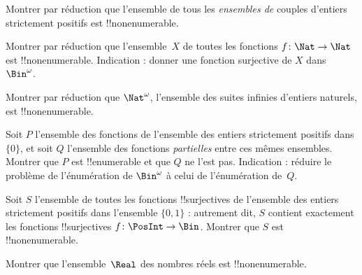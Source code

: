 \documentclass[../../../include/open-logic-section]{subfiles}
\begin{document}
\begin{prob}
Montrer par réduction que l'ensemble de tous les \emph{ensembles de}
couples d'entiers strictement positifs est !!{nonenumerable}.
\end{prob}

\begin{prob}\label{sfr:siz:red:prob:nat-nat}
  Montrer par réduction que l'ensemble~$X$ de toutes les fonctions
  $f\colon \Nat \to \Nat$ est !!{nonenumerable}. Indication : donner
  une fonction surjective de $X$ dans~$\Bin^\omega$.
\end{prob}

\begin{prob}
Montrer par réduction que $\Nat^\omega$, l'ensemble des suites
infinies d'entiers naturels, est !!{nonenumerable}.
\end{prob}

\begin{prob}
Soit $P$ l'ensemble des fonctions de l'ensemble des entiers
strictement positifs dans $\{0\}$, et soit $Q$ l'ensemble des
fonctions \emph{partielles} entre ces mêmes ensembles. Montrer que
$P$ est !!{enumerable} et que $Q$ ne l'est pas. Indication : réduire
le problème de l'énumération de $\Bin^\omega$ à celui de
l'énumération de~$Q$.
\end{prob}

\begin{prob}
Soit $S$ l'ensemble de toutes les fonctions !!{surjective}s de
l'ensemble des entiers strictement positifs dans l'ensemble $\{0,1\}$ :
autrement dit, $S$ contient exactement les fonctions !!{surjective}s
$f\colon \PosInt \to \Bin$. Montrer que $S$ est !!{nonenumerable}.
\end{prob}

\begin{prob}
Montrer que l'ensemble~$\Real$ des nombres réels est !!{nonenumerable}.
\end{prob}
\end{document}
